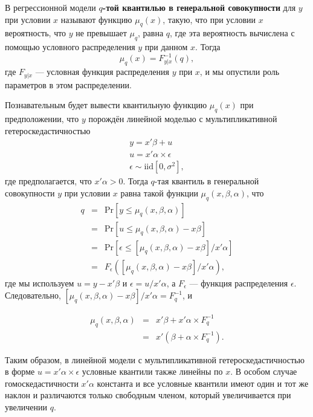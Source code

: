 В регрессионной модели \textbf{$q$-той квантилью в генеральной совокупности} для $y$ при условии $x$ называют функцию $\mu_q(x)$, такую, что при условии $x$ вероятность, что $y$ не превышает  $\mu_q$, равна $q$, где эта вероятность вычислена с помощью условного распределения $y$ при данном $x$. Тогда
\begin{equation}
\mu_q(x) = F^{-1}_{y|x}(q),
\end{equation}
где $F_{y|x}$ --- условная функция распределения $y$ при $x$, и мы опустили роль параметров в этом распределении.

Познавательным будет вывести квантильную функцию $\mu_q(x)$ при предположении, что $y$ порождён линейной моделью с мультипликативной гетероскедастичностью
\[
\begin{array}{c} 
y = x'\beta + u \\ 
u = x'\alpha \times \epsilon \\
\epsilon \sim\mathrm{iid} [0, \sigma^2],
\end{array}
\]
где предполагается, что $x'\alpha > 0$. Тогда $q$-тая квантиль в генеральной совокупности $y$  при условии $x$ равна такой функции $\mu_q(x,\beta,\alpha)$, что
\[
\begin{array}{rcl} 
q & = & \mathrm{Pr} [y\leq \mu_q(x,\beta,\alpha)] \\
& = & \mathrm{Pr} [u \leq \mu_q(x,\beta,\alpha) - x\beta] \\
& = & \mathrm{Pr} [\epsilon \leq [\mu_q(x,\beta,\alpha) - x\beta]/x'\alpha] \\
& = & F_{\epsilon} ([\mu_q(x,\beta,\alpha) - x\beta]/x'\alpha),
\end{array}
\]
где мы используем $u = y-x'\beta$ и $\epsilon = u/x'\alpha$, а $F_{\epsilon}$ --- функция распределения $\epsilon$. Следовательно, $[\mu_q(x,\beta,\alpha) - x\beta]/x'\alpha =F^{-1}_q$, и 

\[
\begin{array}{rcl}
\mu_q(x,\beta,\alpha) & = & x'\beta +x'\alpha \times F^{-1}_q \\
& = & x' (\beta + \alpha \times F^{-1}_q).
\end{array}
\]

Таким образом, в линейной модели с мультипликативной гетероскедастичностью в форме $u = x'\alpha \times \epsilon$ условные квантили также линейны по $x$. В особом случае гомоскедастичности $x'\alpha$ константа и все условные квантили имеют один и тот же наклон и различаются только свободным членом, который увеличивается при увеличении $q$.

